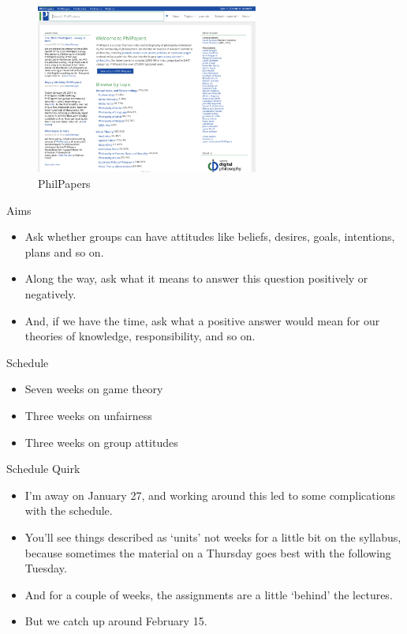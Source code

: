 \documentclass[
  ignorenonframetext,
]{beamer}
\providecommand{\tightlist}{%
  \setlength{\itemsep}{0pt}\setlength{\parskip}{0pt}}
\begin{document}
\begin{frame}
\begin{figure}
\centering
\includegraphics[width=0.65\textwidth,height=0.65\textheight]{images/phil_papers.png}
\caption{PhilPapers}
\end{figure}
\end{frame}

\begin{frame}{Aims}
\protect\hypertarget{aims-2}{}
\begin{itemize}
\tightlist
\item
  Ask whether groups can have attitudes like beliefs, desires, goals,
  intentions, plans and so on.
\item
  Along the way, ask what it means to answer this question positively or
  negatively.
\item
  And, if we have the time, ask what a positive answer would mean for
  our theories of knowledge, responsibility, and so on.
\end{itemize}
\end{frame}

\begin{frame}{Schedule}
\protect\hypertarget{schedule}{}
\begin{itemize}
\tightlist
\item
  Seven weeks on game theory
\item
  Three weeks on unfairness
\item
  Three weeks on group attitudes
\end{itemize}
\end{frame}

\begin{frame}{Schedule Quirk}
\protect\hypertarget{schedule-quirk}{}
\begin{itemize}
\tightlist
\item
  I'm away on January 27, and working around this led to some
  complications with the schedule.
\item
  You'll see things described as `units' not weeks for a little bit on
  the syllabus, because sometimes the material on a Thursday goes best
  with the following Tuesday.
\item
  And for a couple of weeks, the assignments are a little `behind' the
  lectures.
\item
  But we catch up around February 15.
\end{itemize}
\end{frame}
\end{document}
